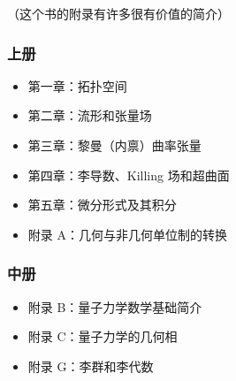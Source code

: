 
（这个书的附录有许多很有价值的简介）

\subsubsection{上册}
\begin{itemize}
\item 第一章：拓扑空间
\item 第二章：流形和张量场
\item 第三章：黎曼（内禀）曲率张量
\item 第四章：李导数、Killing 场和超曲面
\item 第五章：微分形式及其积分
\item 附录 A：几何与非几何单位制的转换
\end{itemize}

\subsubsection{中册}
\begin{itemize}
\item 附录 B：量子力学数学基础简介
\item 附录 C：量子力学的几何相
\item 附录 G：李群和李代数
\end{itemize}

